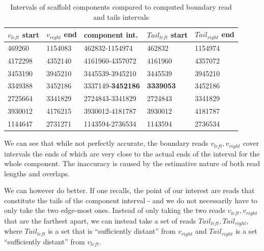 \begin{table}[]
\begin{tabular}{|l|l|l|l|l|}
\hline
\textbf{$v_{left}$ start} & \textbf{$v_{right}$ end} & \textbf{component int.} & \textbf{$Tail_{left}$ start} & \textbf{$Tail_{right}$ end} \\ \hline
469260                 & 1154083               & 462832-1154974          & 462832                   & 1154974                 \\ \hline
4172298                & 4352140               & 4161960-4357072         & 4161960                  & 4357072                 \\ \hline
3453190                & 3945210               & 3445539-3945210         & 3445539                  & 3945210                 \\ \hline
3349388                & 3452186               & 3337149-\textbf{3452186}         & \textbf{3339053}         & 3452186                 \\ \hline
2725664                & 3341829               & 2724843-3341829         & 2724843                  & 3341829                 \\ \hline
3930012                & 4176215               & 3930012-4181787         & 3930012                  & 4181787                 \\ \hline
1144647                & 2731271               & 1143594-2736534         & 1143594                  & 2736534                 \\ \hline
\end{tabular}
\caption{Intervals of scaffold components compared to computed boundary read and tails intervals}
\label{table:tail_intervals}
\end{table}

We can see that while not perfectly accurate, the boundary reads $v_{left}, v_{right}$ cover intervals the ends of which are very close to the actual ends of the interval for the whole component. The inaccuracy is caused by the estimative nature of both read lengths and overlaps.

We can however do better. If one recalls, the point of our interest are reads that constitute the tails of the component interval - and we do not necessarily have to only take the two edge-most ones. Instead of only taking the two reads $v_{left}, v_{right}$ that are the farthest apart, we can instead take a set of reads $Tail_{left}, Tail_{right}$, where $Tail_{left}$ is a set that is “sufficiently distant” from $v_{right}$ and $Tail_{right}$ is a set “sufficiently distant” from $v_{left}$.

